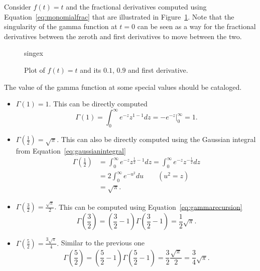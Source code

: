\begin{example}
  Consider $f(t) = t$ and the fractional derivatives computed using Equation~\ref{eq:monomialfrac} that are illustrated in Figure~\ref{fig:singex}. Note that the singularity of the gamma function at $t=0$ can be seen as a way for the fractional derivatives between the zeroth and first derivatives to move between the two.
\end{example}

\begin{figure}
  \centering
  {singex}
  \caption{Plot of $f(t) = t$ and its $0.1$, $0.9$ and first derivative.}
  \label{fig:singex}
\end{figure}

The value of the gamma function at some special values should be cataloged.
\begin{itemize}
  \item $\boxed{ \Gamma(1) = 1. }$ This can be directly computed
    \begin{equation*}
      \Gamma(1) = \int_0^\infty e^{-z} z^{1 - 1} dz = \left. -e^{-z} \right|_0^\infty = 1.
    \end{equation*}
  \item $ \boxed{ \Gamma\left(\frac{1}{2}\right) = \sqrt{\pi}. }$ This can also be directly computed using the Gaussian integral from Equation~\ref{eq:gaussianintegral} 
    \begin{align*}
      \Gamma\left(\frac{1}{2}\right) &= \int_0^\infty e^{-z} z^{\frac{1}{2} - 1} dz 
      = \int_0^\infty e^{-z} z^{-\frac{1}{2}} dz \\ 
      &= 2 \int_0^\infty e^{-u^2} du \qquad (u^2 = z) \\
      &= \sqrt{\pi}.
    \end{align*}
  \item $ \boxed{ \Gamma\left(\frac{3}{2}\right) = \frac{\sqrt{\pi}}{2}. }$  This can be computed using Equation~\ref{eq:gammarecursion}
    \begin{equation*}
      \Gamma \left( \frac{3}{2} \right) = \left( \frac{3}{2} -1 \right) \Gamma \left( \frac{3}{2} - 1 \right) = \frac{1}{2} \sqrt{\pi}.
    \end{equation*}
  \item $\boxed{ \Gamma\left(\frac{5}{2}\right) = \frac{3 \sqrt{\pi}}{4}. }$ Similar to the previous one
    \begin{equation*}
      \Gamma \left( \frac{5}{2} \right) = \left( \frac{5}{2} - 1 \right) \Gamma \left( \frac{5}{2} - 1 \right) = \frac{3}{2} \frac{\sqrt{\pi}}{2} = \frac{3}{4} \sqrt{\pi}.

\end{equation*}
\end{itemize}
